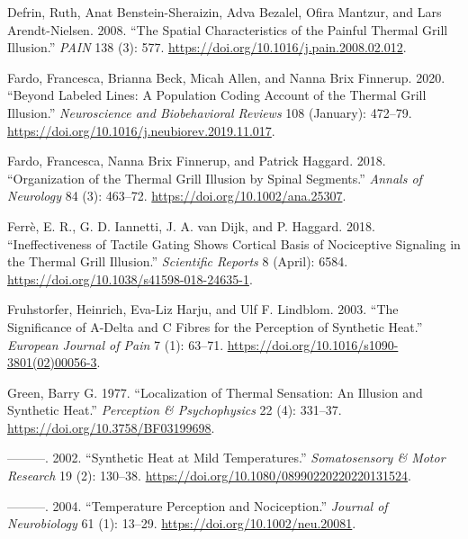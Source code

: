 \documentclass[
]{article}
\newlength{\cslhangindent}
\newlength{\cslentryspacingunit} %
\newenvironment{CSLReferences}[2] %
 {%
  \setlength{\parindent}{0pt}
  \ifodd #1
  \let\oldpar\par
  \def\par{\hangindent=\cslhangindent\oldpar}
  \fi
  \setlength{\parskip}{#2\cslentryspacingunit}
 }%
 {}
\begin{document}
\begin{CSLReferences}{1}{0}
\leavevmode{}%
Defrin, Ruth, Anat Benstein-Sheraizin, Adva Bezalel, Ofira Mantzur, and
Lars Arendt-Nielsen. 2008. {``The Spatial Characteristics of the Painful
Thermal Grill Illusion.''} \emph{PAIN} 138 (3): 577.
\url{https://doi.org/10.1016/j.pain.2008.02.012}.

\leavevmode{}%
Fardo, Francesca, Brianna Beck, Micah Allen, and Nanna Brix Finnerup.
2020. {``Beyond Labeled Lines: {A} Population Coding Account of the
Thermal Grill Illusion.''} \emph{Neuroscience and Biobehavioral Reviews}
108 (January): 472--79.
\url{https://doi.org/10.1016/j.neubiorev.2019.11.017}.

\leavevmode{}%
Fardo, Francesca, Nanna Brix Finnerup, and Patrick Haggard. 2018.
{``Organization of the Thermal Grill Illusion by Spinal Segments.''}
\emph{Annals of Neurology} 84 (3): 463--72.
\url{https://doi.org/10.1002/ana.25307}.

\leavevmode{}%
Ferrè, E. R., G. D. Iannetti, J. A. van Dijk, and P. Haggard. 2018.
{``Ineffectiveness of Tactile Gating Shows Cortical Basis of Nociceptive
Signaling in the {Thermal} {Grill} {Illusion}.''} \emph{Scientific
Reports} 8 (April): 6584.
\url{https://doi.org/10.1038/s41598-018-24635-1}.

\leavevmode{}%
Fruhstorfer, Heinrich, Eva-Liz Harju, and Ulf F. Lindblom. 2003. {``The
Significance of {A}-Delta and {C} Fibres for the Perception of Synthetic
Heat.''} \emph{European Journal of Pain} 7 (1): 63--71.
\url{https://doi.org/10.1016/s1090-3801(02)00056-3}.

\leavevmode{}%
Green, Barry G. 1977. {``Localization of Thermal Sensation: {An}
Illusion and Synthetic Heat.''} \emph{Perception \& Psychophysics} 22
(4): 331--37. \url{https://doi.org/10.3758/BF03199698}.

\leavevmode{}%
---------. 2002. {``Synthetic Heat at Mild Temperatures.''}
\emph{Somatosensory \& Motor Research} 19 (2): 130--38.
\url{https://doi.org/10.1080/08990220220220131524}.

\leavevmode{}%
---------. 2004. {``Temperature Perception and Nociception.''}
\emph{Journal of Neurobiology} 61 (1): 13--29.
\url{https://doi.org/10.1002/neu.20081}.


\end{CSLReferences}
\end{document}
